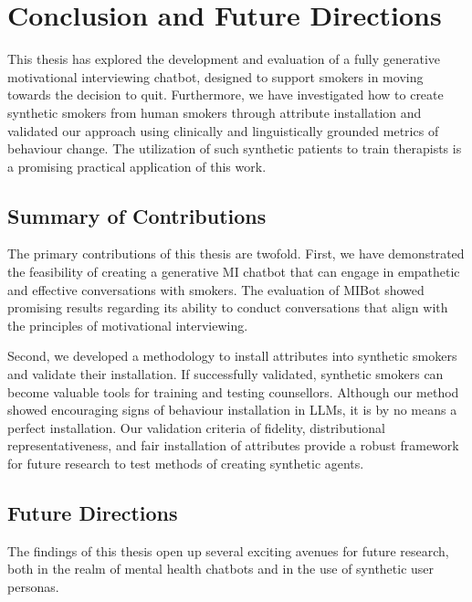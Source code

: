 \chapter{Conclusion and Future Directions}
\label{ch:conclusion}

This thesis has explored the development and evaluation of a fully generative motivational interviewing chatbot, designed to support smokers in moving towards the decision to quit. Furthermore, we have investigated how to create synthetic smokers from human smokers through attribute installation and validated our approach using clinically and linguistically grounded metrics of behaviour change. The utilization of such synthetic patients to train therapists is a promising practical application of this work.


\section{Summary of Contributions}

The primary contributions of this thesis are twofold. First, we have demonstrated the feasibility of creating a generative MI chatbot that can engage in empathetic and effective conversations with smokers. The evaluation of MIBot showed promising results regarding its ability to conduct conversations that align with the principles of motivational interviewing.

Second, we developed a methodology to install attributes into synthetic smokers and validate their installation. If successfully validated, synthetic smokers can become valuable tools for training and testing counsellors. Although our method showed encouraging signs of behaviour installation in LLMs, it is by no means a perfect installation. Our validation criteria of fidelity, distributional representativeness, and fair installation of attributes provide a robust framework for future research to test methods of creating synthetic agents.


\section{Future Directions}
The findings of this thesis open up several exciting avenues for future research, both in the realm of mental health chatbots and in the use of synthetic user personas.

